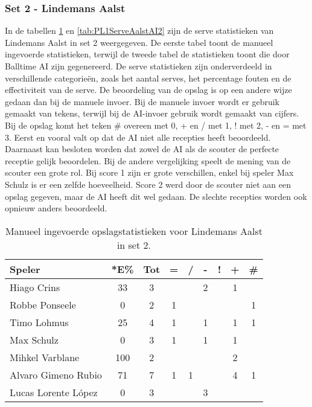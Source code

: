 \subsubsection{Set 2 - Lindemans Aalst}
\label{sec:PL1_Aalst2}
In de tabellen \ref{tab:PL1ServeAalstMan2} en \ref{tab:PL1ServeAalstAI2} zijn de serve statistieken van Lindemans Aalst in set 2 weergegeven. De eerste tabel toont de manueel ingevoerde statistieken, terwijl de tweede tabel de statistieken toont die door Balltime AI zijn gegenereerd. De serve statistieken zijn onderverdeeld in verschillende categorieën, zoals het aantal serves, het percentage fouten en de effectiviteit van de serve. De beoordeling van de opslag is op een andere wijze gedaan dan bij de manuele invoer. Bij de manuele invoer wordt er gebruik gemaakt van tekens, terwijl bij de AI-invoer gebruik wordt gemaakt van cijfers. Bij de opslag komt het teken \# overeen met 0, + en / met 1, ! met 2, - en = met 3. Eerst en vooral valt op dat de AI niet alle recepties heeft beoordeeld. Daarnaast kan besloten worden dat zowel de AI als de scouter de perfecte receptie gelijk beoordelen. Bij de andere vergelijking speelt de mening van de scouter een grote rol. Bij score 1 zijn er grote verschillen, enkel bij speler Max Schulz is er een zelfde hoeveelheid. Score 2 werd door de scouter niet aan een opslag gegeven, maar de AI heeft dit wel gedaan. De slechte recepties worden ook opnieuw anders beoordeeld.

\begin{table}[ht!]
  \centering
  \scriptsize
    \begin{tabular}{|l|c|c|c|c|c|c|c|c|} \hline
      \textbf{Speler} & *E\% & Tot & = & / & - & ! & + & \# \\ \hline
      Hiago Crins & 33 & 3 &  &  & 2 &  & 1 & \\ 
      Robbe Ponseele & 0 & 2 & 1 & & & & & 1 \\
      Timo Lohmus & 25 & 4 & 1 &  & 1 & & 1 & 1 \\ 
      Max Schulz & 0 & 3 & 1 &  & 1 &  & 1 &  \\ 
      Mihkel Varblane & 100 & 2 &  &  &  &  & 2 & \\
      Alvaro Gimeno Rubio & 71 & 7 & 1 & 1 &  &  & 4 & 1\\
      Lucas Lorente López & 0 & 3 &  &  & 3 &  &  &  \\ \hline
  \end{tabular}
  \caption[Manueel ingevoerde opslagstatistieken voor Lindemans Aalst in set 2]{\label{tab:PL1ServeAalstMan2}Manueel ingevoerde opslagstatistieken voor Lindemans Aalst in set 2.}
\end{table}

